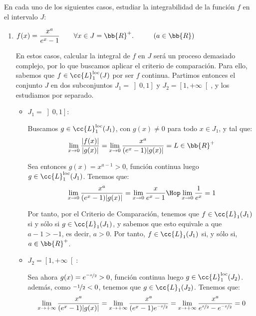 \begin{ejercicio}
    En cada uno de los siguientes casos, estudiar la integrabilidad de la función $f$ en el intervalo $J$:
    \begin{enumerate}
        \item $f(x)=\dfrac{x^a}{e^x-1}\qquad \forall x\in J=\bb{R}^+.\hspace{1cm}(a\in \bb{R})$
        
        En estos casos, calcular la integral de $f$ en $J$ será un proceso demasiado complejo,
        por lo que buscamos aplicar el criterio de comparación. Para ello, sabemos que $f\in \cc{L}_1^{\text{loc}}(J)$ por ser $f$ continua.
        Partimos entonces el conjunto $J$ en dos subconjuntos $J_1=\left]0,1\right]$ y $J_2=\left[1,+\infty\right[$,
        y los estudiamos por separado.
        \begin{itemize}
            \item \ul{$J_1=\left]0,1\right]$}:
            
            Buscamos $g\in \cc{L}_1^{\text{loc}}(J_1)$, con $g(x)\neq 0$ para todo $x\in J_1$, y tal que:
            \begin{equation*}
                \lim_{x\to 0} \dfrac{|f(x)|}{|g(x)|} = \lim_{x\to 0} \dfrac{x^a}{(e^x-1)|g(x)|}
                = L\in \bb{R}^+
            \end{equation*}

            Sea entonces $g(x)=x^{a-1}>0$, función continua luego $g\in \cc{L}_1^{\text{loc}}(J_1)$.
            Tenemos que:
            \begin{equation*}
                \lim_{x\to 0} \dfrac{x^a}{(e^x-1)|g(x)|}
                = \lim_{x\to 0} \dfrac{x}{e^x-1}
                \Hop \lim_{x\to 0} \dfrac{1}{e^x}
                = 1
            \end{equation*}

            Por tanto, por el Criterio de Comparación, tenemos que $f\in \cc{L}_1(J_1)$ si y
            sólo si $g\in \cc{L}_1(J_1)$, y sabemos que esto equivale a que $a-1>-1$, es decir, $a>0$.
            Por tanto, $f\in \cc{L}_1(J_1)$ si, y sólo si, $a\in \bb{R}^+$.

            \item \ul{$J_2=\left[1,+\infty\right[$}:
            
            Sea ahora $g(x)=e^{\nicefrac{-x}{2}}>0$, función continua luego $g\in \cc{L}_1^{\text{loc}}(J_2)$. además, como $\nicefrac{-1}{2}<0$, tenemos que $g\in \cc{L}_1(J_2)$.
            Tenemos que:
            \begin{equation*}
                \lim_{x\to +\infty} \dfrac{x^a}{(e^x-1)|g(x)|}
                = \lim_{x\to +\infty} \dfrac{x^a}{(e^x-1)e^{\nicefrac{-x}{2}}}
                = \lim_{x\to +\infty} \dfrac{x^a}{e^{\nicefrac{x}{2}}-e^{\nicefrac{-x}{2}}}
                = 0
            \end{equation*}


\end{itemize}
\end{enumerate}
\end{ejercicio}
